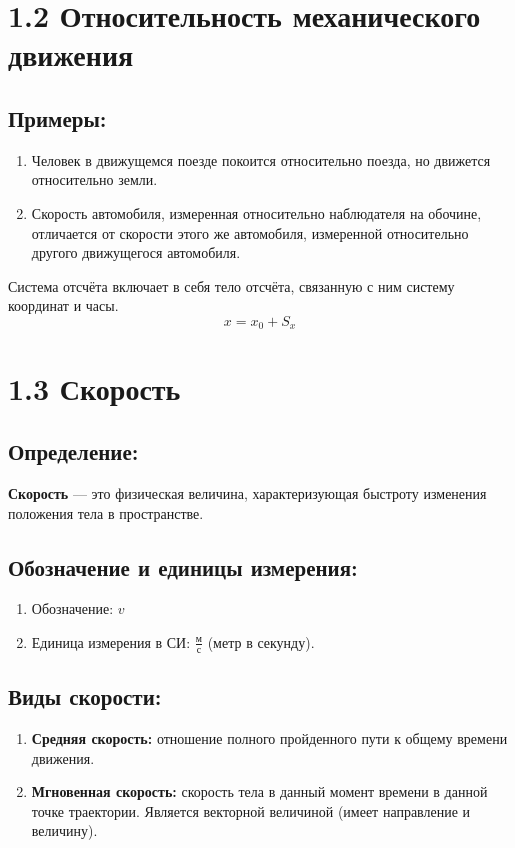 \documentclass[a4paper,12pt]{article}
\begin{document}
\newpage


\section*{1.2 Относительность механического движения}
\vspace{-9pt}
\subsection*{Примеры:}
\vspace{-3pt}
\begin{enumerate} [itemsep=0pt, topsep=0pt, parsep=3pt]
    \item Человек в движущемся поезде покоится относительно поезда, но движется относительно земли.
    \item Скорость автомобиля, измеренная относительно наблюдателя на обочине, отличается от скорости этого же автомобиля, измеренной относительно другого движущегося автомобиля.
\end{enumerate}
Система отсчёта включает в себя тело отсчёта, связанную с ним систему координат и часы. 
$$ x = x_0 + S_x $$


\section*{1.3 Скорость}
\vspace{-9pt}
\subsection*{Определение:}
\vspace{-3pt}
\textbf{Скорость} — это физическая величина, характеризующая быстроту изменения положения тела в пространстве.
\vspace{-9pt}
\subsection*{Обозначение и единицы измерения:}
\vspace{-3pt}
\begin{enumerate} [itemsep=0pt, topsep=0pt, parsep=3pt]
    \item Обозначение: $v$
    \item Единица измерения в СИ: $\frac{м}{с}$ (метр в секунду).
\end{enumerate}
\vspace{-9pt}
\subsection*{Виды скорости:}
\vspace{-3pt}
\begin{enumerate} [itemsep=0pt, topsep=0pt, parsep=3pt]
    \item \textbf{Средняя скорость:} отношение полного пройденного пути к общему времени движения.
    \item \textbf{Мгновенная скорость:} скорость тела в данный момент времени в данной точке траектории. Является векторной величиной (имеет направление и величину).
\end{enumerate}
\end{document}

